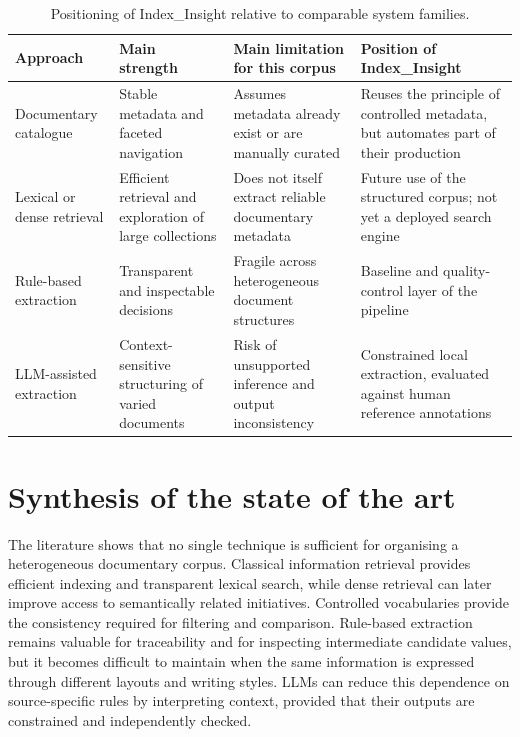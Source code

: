 \documentclass[
11pt,
english,
singlespacing,
headsepline,
]{MastersDoctoralThesis}
\begin{document}
\begin{table}[H]
\centering
\begin{tabular}{p{3.2cm}p{3.5cm}p{3.5cm}p{3.4cm}}
\toprule
Approach & Main strength & Main limitation for this corpus & Position of Index\_Insight \\
\midrule
Documentary catalogue & Stable metadata and faceted navigation & Assumes metadata already exist or are manually curated & Reuses the principle of controlled metadata, but automates part of their production \\

Lexical or dense retrieval & Efficient retrieval and exploration of large collections & Does not itself extract reliable documentary metadata & Future use of the structured corpus; not yet a deployed search engine \\

Rule-based extraction & Transparent and inspectable decisions & Fragile across heterogeneous document structures & Baseline and quality-control layer of the pipeline \\

LLM-assisted extraction & Context-sensitive structuring of varied documents & Risk of unsupported inference and output inconsistency & Constrained local extraction, evaluated against human reference annotations \\
\bottomrule
\end{tabular}
\caption{Positioning of Index\_Insight relative to comparable system families.}
\label{tab:comparable-systems}
\end{table}

\section{Synthesis of the state of the art}

The literature shows that no single technique is sufficient for organising a
heterogeneous documentary corpus. Classical information retrieval provides
efficient indexing and transparent lexical search, while dense retrieval can
later improve access to semantically related initiatives. Controlled
vocabularies provide the consistency required for filtering and comparison.
Rule-based extraction remains valuable for traceability and for inspecting
intermediate candidate values, but it becomes difficult to maintain when the
same information is expressed through different layouts and writing styles.
LLMs can reduce this dependence on source-specific rules by interpreting
context, provided that their outputs are constrained and independently checked.
\end{document}
